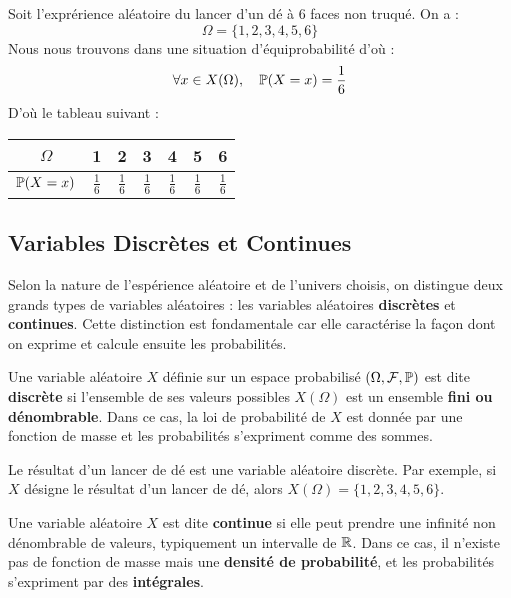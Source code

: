 \begin{example}
    Soit l'exprérience aléatoire du lancer d'un dé à 6 faces non truqué. On a :
        \[ \Omega = \{1,2,3,4,5,6\} \]
    Nous nous trouvons dans une situation d'équiprobabilité d'où :
        \[ \forall x \in X(\Omega), \quad \mathbb{P}(X = x) = \frac{1}{6} \]
    D'où le tableau suivant :
    \begin{center}
        \begin{tabular}{c|c|c|c|c|c|c}
            $\Omega$ & 1 & 2 & 3 & 4 & 5 & 6 \\
            \hline 
            $ \mathbb{P}(X = x)$ & $\frac{1}{6}$ & $\frac{1}{6}$ & $\frac{1}{6}$ & $\frac{1}{6}$ & $\frac{1}{6}$ & $\frac{1}{6}$ \\ 
        \end{tabular}
    \end{center}  
\end{example}

\subsection{Variables Discrètes et Continues}

Selon la nature de l'espérience aléatoire et de l'univers choisis, on distingue deux grands types de variables aléatoires : 
les variables aléatoires \textbf{discrètes} et \textbf{continues}. Cette distinction est fondamentale car elle 
caractérise la façon dont on exprime et calcule ensuite les probabilités.

\begin{definition}
    Une variable aléatoire $X$ définie sur un espace probabilisé $(\Omega, \mathcal{F}, \mathbb{P})$ est dite 
    \textbf{discrète} si l'ensemble de ses valeurs possibles $X(\Omega)$ est un ensemble \textbf{fini ou dénombrable}. 
    Dans ce cas, la loi de probabilité de $X$ est donnée par une fonction de masse et les probabilités 
    s'expriment comme des sommes. 
\end{definition}

\begin{example}
    Le résultat d'un lancer de dé est une variable aléatoire discrète. 
    Par exemple, si $X$ désigne le résultat d’un lancer de dé, alors $X(\Omega) = \{1,2,3,4,5,6\}$.
\end{example}

\begin{definition}
    Une variable aléatoire $X$ est dite \textbf{continue} si elle peut prendre une infinité non dénombrable de valeurs, typiquement un intervalle de $\mathbb{R}$. 
    Dans ce cas, il n'existe pas de fonction de masse mais une \textbf{densité de probabilité}, et les probabilités s'expriment 
    par des \textbf{intégrales}.
\end{definition}


